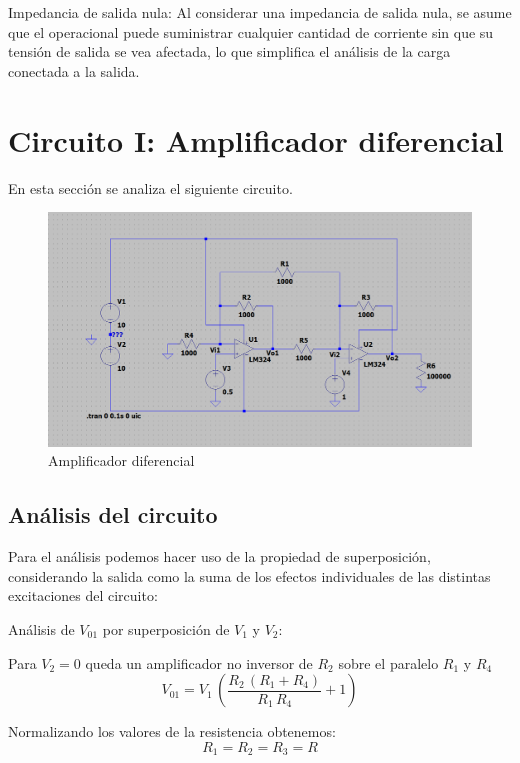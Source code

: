 \documentclass[12pt]{article}
\begin{document}
	Impedancia de salida nula: Al considerar una impedancia de salida nula, se asume que el operacional puede suministrar cualquier cantidad de corriente sin que su tensión de salida se vea afectada, lo que simplifica el análisis de la carga conectada a la salida. \newpage
	
	\section{Circuito I: Amplificador diferencial}
	
		En esta sección se analiza el siguiente circuito.
		\begin{figure}[h]
			\centering
			\includegraphics[width=1\linewidth]{Simulaciones-Resultados/Circuito1_esquematico}
			\caption{Amplificador diferencial}
			\label{fig:circuito1esquematico}
		\end{figure} 
		
		\subsection{Análisis del circuito}
		Para el análisis podemos hacer uso de la propiedad de superposición, considerando la salida como la suma de los
		efectos individuales de las distintas excitaciones del circuito:
		
		Análisis de $V_{01}$ por superposición de $V_1$ y $V_2$:
		
		Para $V_2=0$ queda un amplificador no inversor de $R_2$ sobre el paralelo $R_1$ y $R_4$
		\begin{equation}
			V_{01} = V_1 \,{\left(\frac{R_2 \,{\left(R_1 +R_4 \right)}}{R_1 \,R_4 }+1\right)}
		\end{equation}
		
		Normalizando los valores de la resistencia obtenemos:
		\begin{equation}
			R_1=R_2=R_3=R 
		\end{equation}
		
\end{document}
